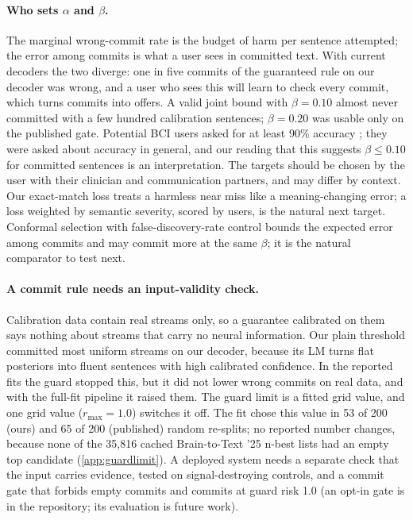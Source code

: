 \paragraph{Who sets $\alpha$ and $\beta$.} The marginal wrong-commit rate is the budget of harm per sentence attempted; the error among commits is what a user sees in committed text. With current decoders the two diverge: one in five commits of the guaranteed rule on our decoder was wrong, and a user who sees this will learn to check every commit, which turns commits into offers. A valid joint bound with $\beta = 0.10$ almost never committed with a few hundred calibration sentences; $\beta = 0.20$ was usable only on the published gate. Potential BCI users asked for at least 90\% accuracy \citep{huggins2011als,huggins2015sci}; they were asked about accuracy in general, and our reading that this suggests $\beta \le 0.10$ for committed sentences is an interpretation. The targets should be chosen by the user with their clinician and communication partners, and may differ by context. Our exact-match loss treats a harmless near miss like a meaning-changing error; a loss weighted by semantic severity, scored by users, is the natural next target. Conformal selection with false-discovery-rate control \citep{jin2023selection,gui2024alignment} bounds the expected error among commits and may commit more at the same $\beta$; it is the natural comparator to test next.

\paragraph{A commit rule needs an input-validity check.} Calibration data contain real streams only, so a guarantee calibrated on them says nothing about streams that carry no neural information. Our plain threshold committed most uniform streams on our decoder, because its LM turns flat posteriors into fluent sentences with high calibrated confidence. In the reported fits the guard stopped this, but it did not lower wrong commits on real data, and with the full-fit pipeline it raised them. The guard limit is a fitted grid value, and one grid value ($r_{\max} = 1.0$) switches it off. The fit chose this value in 53 of 200 (ours) and 65 of 200 (published) random re-splits; no reported number changes, because none of the 35,816 cached Brain-to-Text '25 n-best lists had an empty top candidate (\cref{app:guardlimit}). A deployed system needs a separate check that the input carries evidence, tested on signal-destroying controls, and a commit gate that forbids empty commits and commits at guard risk 1.0 (an opt-in gate is in the repository; its evaluation is future work).

